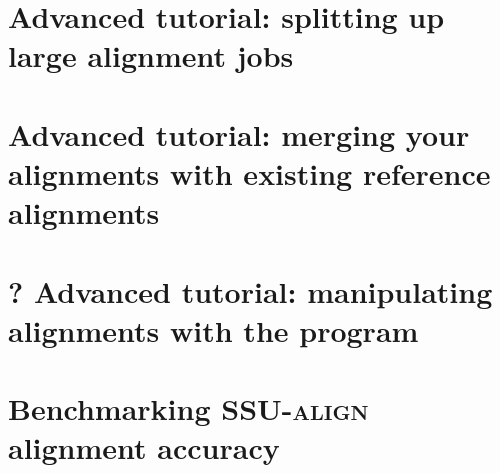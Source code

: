\section{Advanced tutorial: splitting up large alignment jobs}
\section{Advanced tutorial: merging your alignments with existing
  reference alignments}
\section{? Advanced tutorial: manipulating alignments with the
   program}
\section{Benchmarking \textsc{SSU-align} alignment accuracy}

